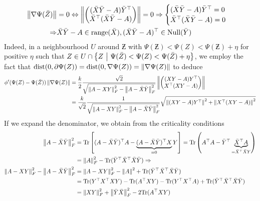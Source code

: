 \documentclass[10pt]{article}
\begin{document}
\begin{align*}
    \left \| \nabla \Psi(\bar{Z}) \right \| &= 0 \Leftrightarrow
    \left \| \begin{pmatrix} (\bar{X} \bar{Y} - A) \bar{Y}^\top \\ \bar{X}^\top (\bar{X} \bar{Y} - A) \end{pmatrix} \right \| =
    0 \Rightarrow
    \begin{cases}
        (\bar{X} \bar{Y} - A) \bar{Y}^\top = 0 \\
        \bar{X}^\top (\bar{X} \bar{Y} - A) = 0
    \end{cases} \\
    \Rightarrow &
        \bar{X} \bar{Y} - A \in \mathrm{range}(\bar{X}), (\bar{X} \bar{Y} - A)^\top \in
        \mathrm{Null}(\bar{Y})
\end{align*}
Indeed, in a neighbourhood $U$ around $\Zbar$ with $
\Psi(\Zbar) < \Psi(Z) < \Psi(\Zbar) + \eta$ for positive $\eta$ such that
$Z \in U \cap \left\{ Z \ \middle| \  \Psi(\bar{Z}) < \Psi(Z) < \Psi(\bar{Z}) + \eta \right\}$,
we employ the fact that $\mathrm{dist}(0, \partial \Psi(Z)) =
\mathrm{dist}(0, \nabla \Psi(Z)) = \left \| \nabla \Psi(Z) \right \|$ to deduce
\begin{align*}
    \phi'(\Psi(Z) - \Psi(\bar{Z})) \left \| \nabla \Psi(Z) \right \| &=
    \frac{k}{2} \frac{\sqrt{2}}{\sqrt{\left \| A - XY \right \|_F^2 - \left \| A - \bar{X}
    \bar{Y} \right \|_F^2}}
    \left \| \begin{pmatrix} (X Y - A)Y^\top \\ X^\top (XY - A) \end{pmatrix} \right \| \\
    &= \frac{k}{\sqrt{2}} \frac{1}{\sqrt{\left \| A - XY \right \|_F^2 - \left \| A - \bar{X}
    \bar{Y} \right \|_F^2}} \sqrt{\left \| (XY - A)Y^\top \right \|^2 + \left \| X^\top(XY - A) \right \|^2}
\end{align*}
If we expand the denominator, we obtain from the criticality conditions
\begin{align*}
    \left \| A - \bar{X} \bar{Y} \right \|_F^2 &=
    \mathrm{Tr}\left[ (A - \bar{X} \bar{Y})^\top A - \underbrace{(A -
    \bar{X}\bar{Y})^\top X}_{= 0} Y \right]
    = \mathrm{Tr}\left( A^\top A -\bar{Y}^\top \underbrace{\bar{X}^\top A}_{=
    \bar{X}^\top \bar{X} Y} \right) \\
    &= \left \| A \right \|_F^2 - \mathrm{Tr}(\bar{Y}^\top
    \bar{X}^\top \bar{X} \bar{Y}) \Rightarrow \\
    \left \| A - XY \right \|_F^2 - \left \| A - \bar{X} \bar{Y} \right \|_F^2 &=
    \left \| A - XY \right \|_F^2 - \left \| A \right \|^2 + \mathrm{Tr}(\bar{Y}^\top \bar{X}^\top
    \bar{X} \bar{Y}) \\
    &= \mathrm{Tr}(Y^\top X^\top X Y) - \mathrm{Tr}(A^\top XY) -
       \mathrm{Tr}(Y^\top X^\top A) + \mathrm{Tr}(\bar{Y}^\top \bar{X}^\top
       \bar{X} \bar{Y}) \\
    &= \left \| XY \right \|_F^2 + \left \| \bar{Y} \bar{X} \right \|_F^2 - 2 \mathrm{Tr}(A^\top XY)
\end{align*}
\end{document}
